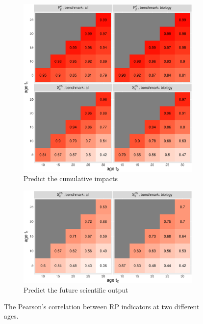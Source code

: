 \begin{figure}[ht!]
    \centering
    \begin{subfigure}[b]{0.8\textwidth}
        \centering
             \includegraphics[width=\textwidth]{figures/pred_power/current/heatmap_cor.eps}
         \caption{Predict the cumulative impacts}
         \label{fig:hm_rp_current}
    \end{subfigure}
    
    \begin{subfigure}[b]{0.8\textwidth}
        \centering
             \includegraphics[width=\textwidth]{figures/pred_power/future/heatmap_cor.eps}
         \caption{Predict the future scientific output}
         \label{fig:hm_rp_future}
    \end{subfigure}
    \caption{The Pearson's correlation between RP indicators at two different ages. }
    \label{fig:hm_rp}
\end{figure}
